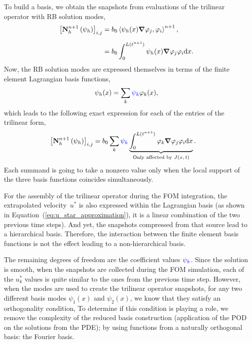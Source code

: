 \documentclass[../../thesis.tex]{subfiles}
\newcommand{\inner}[2]{\left<#1, #2\right>}
\newcommand{\Ah}[1]{\ensuremath{\vb{#1}^{n+1}_h}}
\begin{document}
To build a basis, we obtain the snapshots from evaluations 
of the trilinear operator with RB solution modes,
\begin{equation}
    \begin{split}
        \qty[\Ah{N}\left(\psi_{h}\right)]_{i,j}
        &= b_0 \inner{\psi_h(x)\grad \varphi_j}{\varphi_i}^{n+1},
        \\[2mm]
        &= b_0 \int_{0}^{L(t^{n+1})} \psi_h(x) \grad \varphi_j \varphi_i \dd x.
    \end{split}
\end{equation}
Now, the RB solution modes are expressed themselves in terms of 
the finite element Lagrangian basis functions,
\begin{equation}
    \psi_h(x) = \sum_{k} 
    \textcolor{blue}{\psi_k} 
    \varphi_{k}(x),
\end{equation}
which leads to the following exact expression for each of the entries of the trilinear form,
\begin{equation}
    \begin{split}
        \qty[\Ah{N}\left(\psi_{h}\right)]_{i,j}
        &= b_0 \sum_k 
        \textcolor{blue}{\psi_k} 
        \underbrace{\int_{0}^{L(t^{n+1})} 
        \varphi_{k} \grad \varphi_j \varphi_i \dd x}_{\text{Only affected by $J(x, t)$}}.
    \end{split}
    \label{eq:appendix_exact_representation_triliear_form}
\end{equation}
Each summand is going to take a nonzero value only when the local support of the three
basis functions coincides simultaneously.

For the assembly of the trilinear operator during the FOM integration, 
the extrapolated velocity~$u^{*}$ is also expressed within the Lagrangian basis
(as shown in Equation~(\ref{eq:u_star_approximation}), 
it is a linear combination of the two previous time steps).
And yet, the snapshots compressed from that source lead to a hierarchical basis.
Therefore, the interaction between the finite element basis functions
is not the effect leading to a non-hierarchical basis.

The remaining degrees of freedom are the coefficient values 
$\textcolor{blue}{\psi_k}$.
Since the solution is smooth,
when the snapshots are collected during the FOM simulation, 
each of the $u_k^{*}$ values is quite similar to the ones from the previous time step.
However, when the modes are used to create 
the trilinear operator snapshots, 
for any two different basis modes $\psi_1(x)$ and $\psi_2(x)$,
we know that they satisfy an orthogonality condition,
To determine if this condition is playing a role, 
we remove the complexity of the reduced basis construction 
(application of the POD on the solutions from the PDE);
by using functions from a naturally orthogonal basis:
the Fourier basis.
\end{document}
